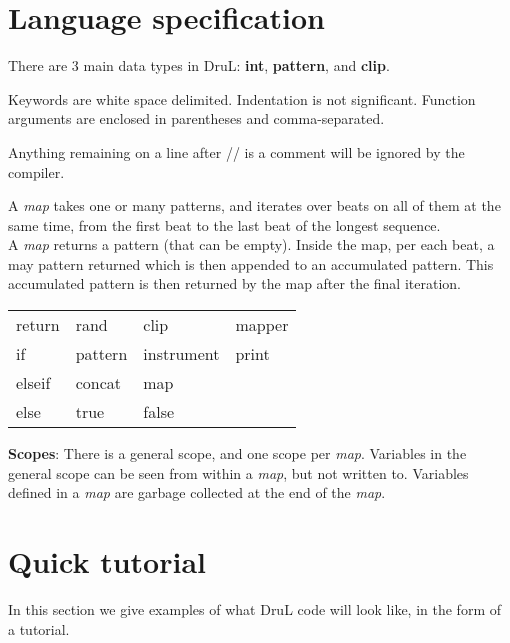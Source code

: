 \section{Language specification}
There are $3$ main data types in DruL: \textbf{int}, \textbf{pattern},
and \textbf{clip}.

Keywords are white space delimited. Indentation is not significant.
Function arguments are enclosed in parentheses and comma-separated.

Anything remaining on a line after // is a comment will be ignored by the compiler.

A \textit{map} takes one or many patterns, and iterates over beats on all
of them at the same time, from the first beat to the last beat of the longest
sequence.\\
A \textit{map} returns a pattern (that can be empty).  Inside the map, per each beat, a may pattern
returned which is then appended to an accumulated pattern.
This accumulated pattern is then returned by the map after the final iteration.

\begin{table}[htb]
\begin{center}
\begin{tabular}{llll}
  return & rand    & clip       & mapper \\
  if     & pattern & instrument & print  \\
  elseif & concat  & map        &        \\
  else   & true    & false      &
\end{tabular}
\end{center}
\end{table}

\textbf{Scopes}: There is a general scope, and one scope per \textit{map}.
Variables in the general scope can be seen from within a \textit{map}, but not written to.
Variables defined in a \textit{map} are garbage collected at the end of the \textit{map}.

\pagebreak

\section{Quick tutorial}
In this section we give examples of what DruL code will look like, in the form
of a tutorial.

